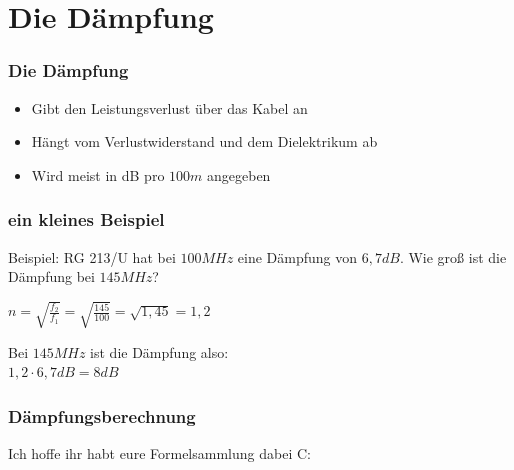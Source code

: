 \section*{Die D\"ampfung}
\begin{frame}
\frametitle{Die Dämpfung}
\begin{itemize}
	\item	Gibt den Leistungsverlust über das Kabel an
	\item	Hängt vom Verlustwiderstand und dem Dielektrikum ab
	\item	Wird meist in dB pro $100m$ angegeben
\end{itemize}
\end{frame}

\begin{frame}
\frametitle{ein kleines Beispiel}
	Beispiel: RG 213/U hat bei $100MHz$ eine Dämpfung von $6,7dB$. Wie groß ist die Dämpfung bei $145MHz$?
	\vspace{1cm}
	\begin{Large}
	$n = \sqrt{\frac{f_2}{f_1}} = \sqrt{\frac{145}{100}} = \sqrt{1,45} = 1,2$
	\end{Large}
	\vspace{1cm}
	Bei $145MHz$ ist die Dämpfung also: \\
	$1,2 \cdot 6,7dB = 8dB$
\end{frame}

\begin{frame}
\frametitle{D\"ampfungsberechnung}
\begin{Large}
Ich hoffe ihr habt eure Formelsammlung dabei C:
\end{Large}
\end{frame}

